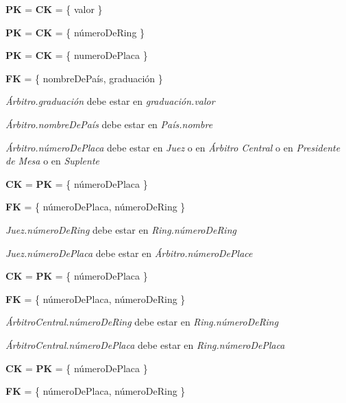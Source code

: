 
\textbf{PK} = \textbf{CK} = \{ valor \}


\textbf{PK} = \textbf{CK} = \{ númeroDeRing \}\\


\textbf{PK} = \textbf{CK} = \{ numeroDePlaca \}

\textbf{FK} = \{ nombreDePaís, graduación \}

\textit{Árbitro.graduación} debe estar en \textit{graduación.valor}

\textit{Árbitro.nombreDePaís} debe estar en \textit{País.nombre}

\textit{Árbitro.númeroDePlaca} debe estar en \textit{Juez} o en \textit{Árbitro Central} o en \textit{Presidente de Mesa} o en \textit{Suplente}\\

 
\textbf{CK} = \textbf{PK} = \{ númeroDePlaca \}
 
\textbf{FK} = \{ númeroDePlaca, númeroDeRing \}

\textit{Juez.númeroDeRing} debe estar en \textit{Ring.númeroDeRing}

\textit{Juez.númeroDePlaca} debe estar en \textit{Árbitro.númeroDePlace}\\


\textbf{CK} = \textbf{PK} = \{ númeroDePlaca \}
 
\textbf{FK} = \{ númeroDePlaca, númeroDeRing \}
 
\textit{ÁrbitroCentral.númeroDeRing} debe estar en \textit{Ring.númeroDeRing}

\textit{ÁrbitroCentral.númeroDePlaca} debe estar en \textit{Ring.númeroDePlaca}\\


\textbf{CK} = \textbf{PK} = \{ númeroDePlaca \}
 
\textbf{FK} = \{ númeroDePlaca, númeroDeRing \}
 
